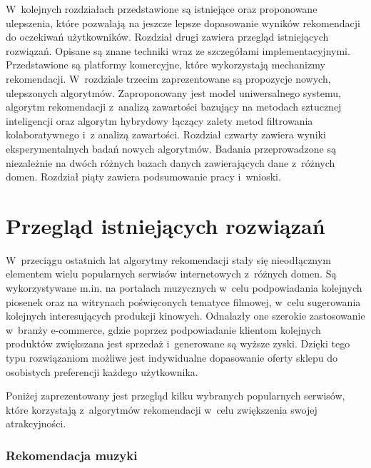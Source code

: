 \documentclass[twoside]{iisthesis}
\begin{document}
	 W~kolejnych rozdziałach przedstawione są istniejące oraz proponowane ulepszenia, które pozwalają na jeszcze lepsze dopasowanie wyników rekomendacji do oczekiwań użytkowników. Rozdział drugi zawiera przegląd istniejących rozwiązań. Opisane są znane techniki wraz ze szczegółami implementacyjnymi. Przedstawione są platformy komercyjne, które wykorzystają mechanizmy rekomendacji. W~rozdziale trzecim zaprezentowane są propozycje nowych, ulepszonych algorytmów. Zaproponowany jest model uniwersalnego systemu, algorytm rekomendacji z~analizą zawartości bazujący na metodach sztucznej inteligencji oraz algorytm hybrydowy łączący zalety metod filtrowania kolaboratywnego i~z analizą zawartości. Rozdział czwarty zawiera wyniki eksperymentalnych badań nowych algorytmów. Badania przeprowadzone są niezależnie na dwóch różnych bazach danych zawierających dane z~różnych domen. Rozdział piąty zawiera podsumowanie pracy i~wnioski.
	 
 
 \chapter{Przegląd istniejących rozwiązań}

	 W~przeciągu ostatnich lat algorytmy rekomendacji stały się nieodłącznym elementem wielu popularnych serwisów internetowych z~różnych domen. Są wykorzystywane m.in. na portalach muzycznych w~celu podpowiadania kolejnych piosenek oraz na witrynach poświęconych tematyce filmowej, w~celu sugerowania kolejnych interesujących produkcji kinowych. Odnalazły one szerokie zastosowanie w~branży e-commerce, gdzie poprzez podpowiadanie klientom kolejnych produktów zwiększana jest sprzedaż i~generowane są wyższe zyski. Dzięki tego typu rozwiązaniom możliwe jest indywidualne dopasowanie oferty sklepu do osobistych preferencji każdego użytkownika. 
	 
	 Poniżej zaprezentowany jest przegląd kilku wybranych popularnych serwisów, które korzystają z~algorytmów rekomendacji w~celu zwiększenia swojej atrakcyjności.
	  
	 \subsection{Rekomendacja muzyki}
	 
\end{document}
